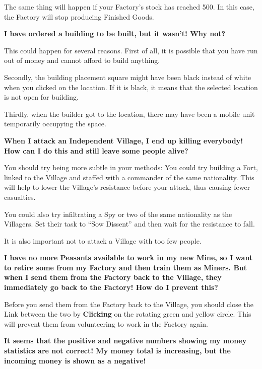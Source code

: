 The same thing will happen if your Factory’s stock has reached 500. In this case, the Factory will stop producing Finished Goods.

{\large \textbf{\textsf{I have ordered a building to be built, but it wasn’t! Why not?}}}

This could happen for several reasons. First of all, it is possible that you have run out of money and cannot afford to build anything.

Secondly, the building placement square might have been black instead of white when you clicked on the location. If it is black, it means that the selected location is not open for building.


Thirdly, when the builder got to the location, there may have been a mobile unit temporarily occupying the space.

{\large \textbf{\textsf{When I attack an Independent Village, I end up killing everybody! How can I do this and still leave some people alive?}}}

You should try being more subtle in your methods: You could try building a Fort, linked to the Village and staffed with a commander of the same nationality. This will help to lower the Village’s resistance before your attack, thus causing fewer casualties.


You could also try infiltrating a Spy or two of the same nationality as the Villagers. Set their task to “Sow Dissent” and then wait for the resistance to fall.

It is also important not to attack a Village with too few people.

{\large \textbf{\textsf{I have no more Peasants available to work in my new Mine, so I want to retire some from my Factory and then train them as Miners. But when I send them from the Factory back to the Village, they immediately go back to the Factory! How do I prevent this?}}}

Before you send them from the Factory back to the Village, you should close the Link between the two by \textbf{Clicking} on the rotating green and yellow circle. This will prevent them from volunteering to work in the Factory again.

{\large \textbf{\textsf{It seems that the positive and negative numbers showing my money statistics are not correct! My money total is increasing, but the incoming money is shown as a negative!}}}


